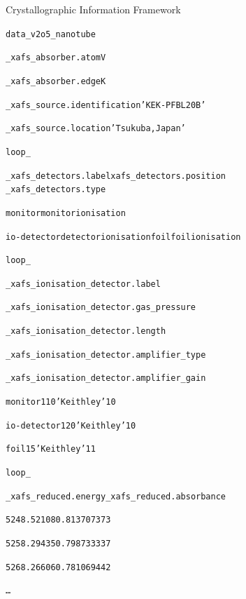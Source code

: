 \documentclass[final]{beamer}
\begin{document}
\begin{frame}{}
\begin{columns}[t]
\begin{column}{.34\linewidth}
\begin{block}{Crystallographic Information Framework}
          {\centering \begin{minipage}{0.8\linewidth}
              \begin{alltt}
                {\tiny
                  data\_v2o5\_nanotube\par
                  \_xafs\_absorber.atom   V\par
                  \_xafs\_absorber.edge    K\par
                  \_xafs\_source.identification   'KEK-PF BL20B'\par
                  \_xafs\_source.location         'Tsukuba, Japan'\par
                  loop\_\par
                  \_xafs\_detectors.label xafs\_detectors.position
                  \_xafs\_detectors.type\par
                  monitor      monitor    ionisation\par
                  io-detector  detector   ionisation    foil         foil       ionisation\par
                  \par
                  loop\_\par
                  \_xafs\_ionisation\_detector.label\par
                  \_xafs\_ionisation\_detector.gas\_pressure\par
                  \_xafs\_ionisation\_detector.length\par
                  \_xafs\_ionisation\_detector.amplifier\_type\par
                  \_xafs\_ionisation\_detector.amplifier\_gain\par
                  monitor         1      10    'Keithley'    10\par
                  io-detector     1      20    'Keithley'    10\par
                  foil            1      5     'Keithley'    11\par
                  \par
                  loop\_\par
                  \_xafs\_reduced.energy \_xafs\_reduced.absorbance\par
                  5248.52108 0.813707373\par
                  5258.29435 0.798733337\par
                  5268.26606 0.781069442\par
                  \ldots\par
                }
              \end{alltt}
              \end{minipage} }



\end{block}
\end{column}
\end{columns}
\end{frame}
\end{document}
